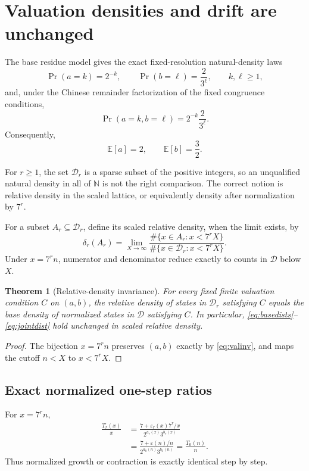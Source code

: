 \documentclass[11pt]{article}
\newtheorem{theorem}{Theorem}[section]
\newcommand{\N}{\mathbb{N}}
\newcommand{\eps}{\varepsilon}
\begin{document}
\section{Valuation densities and drift are unchanged}
The base residue model gives the exact fixed-resolution natural-density laws
\begin{equation}
\Pr(a=k)=2^{-k},\qquad
\Pr(b=\ell)=\frac{2}{3^\ell},\qquad k,\ell\ge1,
\label{eq:basedists}
\end{equation}
and, under the Chinese remainder factorization of the fixed congruence conditions,
\begin{equation}
\Pr(a=k,b=\ell)=2^{-k}\frac{2}{3^\ell}.
\label{eq:jointdist}
\end{equation}
Consequently,
\begin{equation}
\mathbb E[a]=2,\qquad \mathbb E[b]=\frac32.
\label{eq:means}
\end{equation}

For $r\ge1$, the set $\mathcal D_r$ is a sparse subset of the positive integers, so an unqualified natural density in all of $\N$ is not the right comparison. The correct notion is relative density in the scaled lattice, or equivalently density after normalization by $7^r$.

For a subset $A_r\subseteq\mathcal D_r$, define its scaled relative density, when the limit exists, by
\begin{equation}
\delta_r(A_r)=\lim_{X\to\infty}
\frac{\#\{x\in A_r:x<7^rX\}}
{\#\{x\in\mathcal D_r:x<7^rX\}}.
\label{eq:reldensity}
\end{equation}
Under $x=7^rn$, numerator and denominator reduce exactly to counts in $\mathcal D$ below $X$.

\begin{theorem}[Relative-density invariance]
For every fixed finite valuation condition $C$ on $(a,b)$, the relative density of states in $\mathcal D_r$ satisfying $C$ equals the base density of normalized states in $\mathcal D$ satisfying $C$. In particular, \eqref{eq:basedists}--\eqref{eq:jointdist} hold unchanged in scaled relative density.
\end{theorem}
\begin{proof}
The bijection $x=7^rn$ preserves $(a,b)$ exactly by \eqref{eq:valinv}, and maps the cutoff $n<X$ to $x<7^rX$.
\end{proof}

\subsection{Exact normalized one-step ratios}
For $x=7^rn$,
\begin{align}
\frac{T_r(x)}{x}
&=\frac{7+\eps_r(x)7^r/x}{2^{a_r(x)}3^{b_r(x)}}
\label{eq:scaledratio1}\\
&=\frac{7+\eps(n)/n}{2^{a_0(n)}3^{b_0(n)}}
=\frac{T_0(n)}{n}.
\label{eq:scaledratio2}
\end{align}
Thus normalized growth or contraction is exactly identical step by step.
\end{document}
